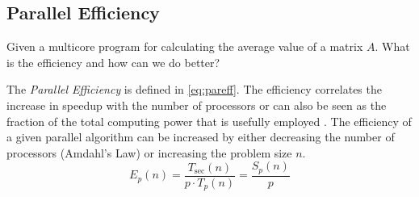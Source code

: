 \documentclass[../main.tex]{subfiles}
\begin{document}
\subsection{Parallel Efficiency}
\label{q:efficiency}
\begin{question}
Given a multicore program for calculating the average value of a matrix $A$. What is the efficiency and how can we do
better?
\end{question}
\begin{solution} The \emph{Parallel Efficiency} is defined in \autoref{eq:pareff}.
	The efficiency correlates the increase in speedup with the number of processors or can also be seen as the fraction of the total computing power that is usefully employed \cite[p.~141]{bisseling04}.
	The efficiency of a given parallel algorithm can be increased by either decreasing the number of processors (Amdahl's Law) or increasing the problem size $n$.
\begin{equation}\label{eq:pareff}
	E_p(n) = \frac{T_\text{sec}(n)}{p \cdot T_p(n)} = \frac{S_p(n)}{p}
\end{equation}
\end{solution}
\end{document}
